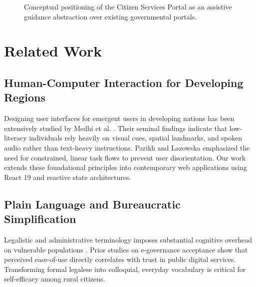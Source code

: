 \documentclass[conference]{IEEEtran}
\begin{document}
\begin{figure}[htbp]
\centering
{}
\caption{Conceptual positioning of the Citizen Services Portal as an assistive guidance abstraction over existing governmental portals.}
\label{fig:concept}
\end{figure}

\section{Related Work}
\subsection{Human-Computer Interaction for Developing Regions}
Designing user interfaces for emergent users in developing nations has been extensively studied by Medhi et al. \cite{medhi2007optimal, medhi2006cell}. Their seminal findings indicate that low-literacy individuals rely heavily on visual cues, spatial landmarks, and spoken audio rather than text-heavy instructions. Parikh and Lazowska \cite{parikh2006designing} emphasized the need for constrained, linear task flows to prevent user disorientation. Our work extends these foundational principles into contemporary web applications using React 19 and reactive state architectures.

\subsection{Plain Language and Bureaucratic Simplification}
Legalistic and administrative terminology imposes substantial cognitive overhead on vulnerable populations \cite{joshi2011designing}. Prior studies on e-governance acceptance \cite{carter2005utilization, bhattacharya2017enabling} show that perceived ease-of-use directly correlates with trust in public digital services. Transforming formal legalese into colloquial, everyday vocabulary is critical for self-efficacy among rural citizens.
\end{document}
